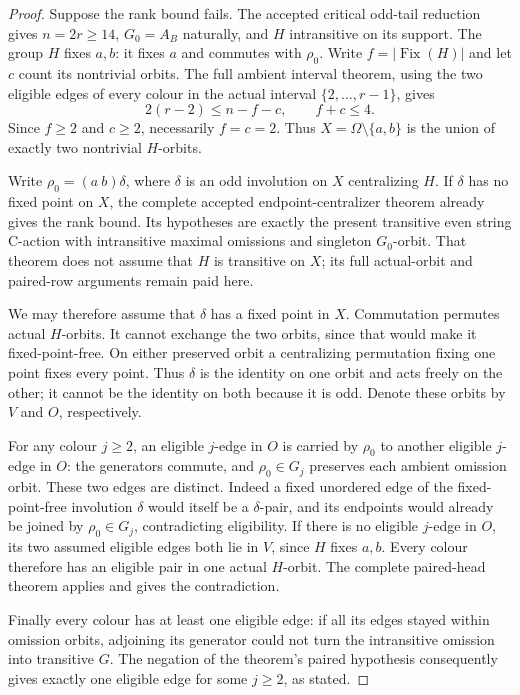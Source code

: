 \documentclass[11pt,a4paper]{article}
\begin{document}
\begin{proof}
Suppose the rank bound fails. The accepted critical odd-tail
reduction gives $n=2r\ge14$, $G_0=A_B$ naturally, and $H$
intransitive on its support. The group $H$ fixes $a,b$:
it fixes $a$ and commutes with $\rho_0$.
Write $f=|\operatorname{Fix}(H)|$ and let $c$ count its
nontrivial orbits. The full ambient interval theorem, using the
two eligible edges of every colour in the actual interval
$\{2,\ldots,r-1\}$, gives
\[
       2(r-2)\le n-f-c,\qquad f+c\le4.
\]
Since $f\ge2$ and $c\ge2$, necessarily $f=c=2$.
Thus $X=\Omega\setminus\{a,b\}$ is the union of exactly
two nontrivial $H$-orbits.

Write $\rho_0=(a\ b)\delta$, where $\delta$ is an odd
involution on $X$ centralizing $H$. If $\delta$ has no fixed
point on $X$, the complete accepted endpoint-centralizer theorem
already gives the rank bound. Its hypotheses are exactly the
present transitive even string C-action with intransitive maximal
omissions and singleton $G_0$-orbit. That theorem does not assume
that $H$ is transitive on $X$; its full actual-orbit and paired-row
arguments remain paid here.

We may therefore assume that $\delta$ has a fixed point in $X$.
Commutation permutes actual $H$-orbits. It cannot exchange the two
orbits, since that would make it fixed-point-free. On either
preserved orbit a centralizing permutation fixing one point fixes
every point. Thus $\delta$ is the identity on one orbit and acts
freely on the other; it cannot be the identity on both because
it is odd. Denote these orbits by $V$ and $O$, respectively.

For any colour $j\ge2$, an eligible $j$-edge in $O$ is carried
by $\rho_0$ to another eligible $j$-edge in $O$: the generators
commute, and $\rho_0\in G_j$ preserves each ambient omission
orbit. These two edges are distinct. Indeed a fixed unordered
edge of the fixed-point-free involution $\delta$ would itself
be a $\delta$-pair, and its endpoints would already be joined
by $\rho_0\in G_j$, contradicting eligibility.
If there is no eligible $j$-edge in $O$, its two assumed eligible
edges both lie in $V$, since $H$ fixes $a,b$.
Every colour therefore has an eligible pair in one actual
$H$-orbit. The complete paired-head theorem applies and gives
the contradiction.

Finally every colour has at least one eligible edge: if all its
edges stayed within omission orbits, adjoining its generator
could not turn the intransitive omission into transitive $G$.
The negation of the theorem's paired hypothesis consequently gives
exactly one eligible edge for some $j\ge2$, as stated.
\end{proof}
\end{document}
